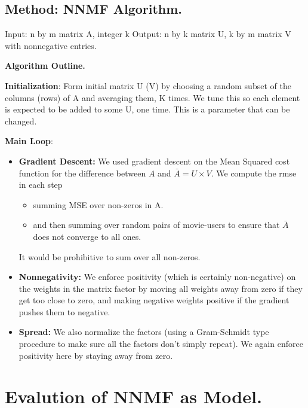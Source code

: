 \documentclass[11pt]{article}
\begin{document}
\subsection{Method: NNMF Algorithm.}

Input: n by m matrix A, integer k
Output:  n by k matrix U, k by m matrix V with nonnegative entries.

{\bf Algorithm Outline.}

{\bf Initialization}: Form initial matrix U (V) by choosing a random subset
of the columns (rows) of A and averaging them, K times.
We tune this so each element is expected to be added
to some U, one time. This is a parameter that
can be changed.

{\bf Main Loop}:
\begin{itemize}
\item {\bf Gradient Descent:}
We used gradient descent on the Mean Squared cost function for the difference
between $A$ and $\bar{A} = U \times V$.  We compute the rmse in each
step

\begin{itemize}

\item summing MSE over non-zeros in A.
\item and then summing over random pairs of movie-users to 
ensure that $\bar{A}$ does not converge to all ones.

\end{itemize}

It would be prohibitive to sum over all non-zeros. 

\item
{\bf Nonnegativity:} We enforce positivity (which is certainly non-negative) 
on the weights in the matrix
factor by moving all weights away from zero if they
get too close to zero, and making negative weights
positive if the gradient pushes them to negative.

\item {\bf Spread:} We also normalize the factors (using a Gram-Schmidt type
         procedure to make sure all the factors don't simply repeat).
         We again enforce positivity here by staying away from zero.

\end{itemize}


\section{Evalution of NNMF as Model.}
\end{document}
